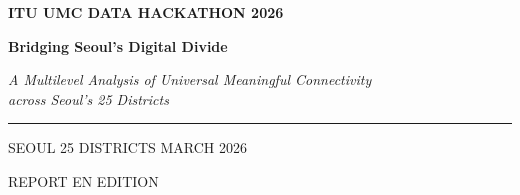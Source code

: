 




\onecolumn
\thispagestyle{empty}
\begin{center}
  \vspace*{0.08\textheight}

  {\sffamily\small\color{muted}\textbf{ITU UMC DATA HACKATHON 2026}}

  \vspace{20pt}

  {\sffamily\bfseries\color{primary}\Huge Bridging Seoul's Digital Divide}

  \vspace{18pt}

  {\itshape\Large A Multilevel Analysis of Universal Meaningful Connectivity\\across Seoul's 25 Districts}

  \vspace{32pt}

  {\color{rule}\rule{0.4\textwidth}{0.6pt}}

  \vspace{20pt}

  {\sffamily\small\color{muted}SEOUL \textperiodcentered{} 25 DISTRICTS \textperiodcentered{} MARCH 2026}

  \vspace{6pt}

  {\sffamily\footnotesize\color{muted}REPORT \textperiodcentered{} EN EDITION}
\end{center}
\clearpage

\twocolumn










